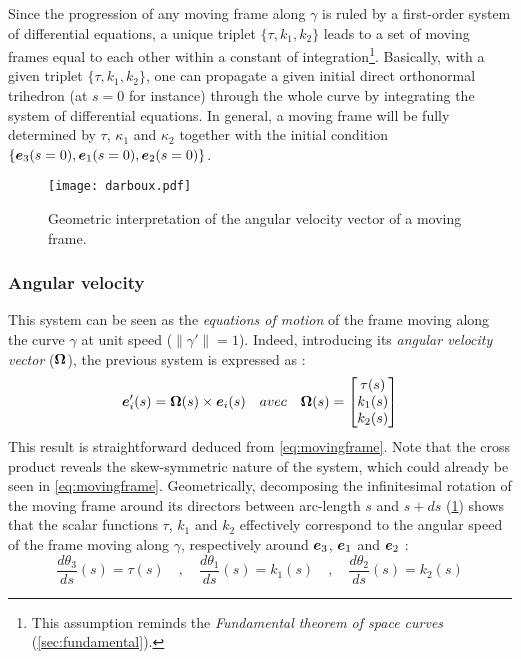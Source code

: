 Since the progression of any moving frame along $\gamma$ is ruled by a first-order system of differential equations, a unique triplet $\{\tau, k_{1}, k_{2}\}$ leads to a set of moving frames equal to each other within a constant of integration\footnote{
This assumption reminds the \emph{Fundamental theorem of space curves} (\cref{sec:fundamental}).
}. Basically, with a given triplet $\{\tau, k_{1}, k_{2}\}$, one can propagate a given initial direct orthonormal trihedron (at $s=0$ for instance) through the whole curve by integrating the system of differential equations. In general, a moving frame will be fully determined by $\tau$, $\kappa_{1}$ and $\kappa_{2}$ together with the initial condition $\{\boldsymbol{e}_{3}(s=0),\boldsymbol{e}_{1}(s=0),\boldsymbol{e}_{2}(s=0)\}$.

\begin{figure}[t]
\centering
\texttt{[image: darboux.pdf]}
\caption{Geometric interpretation of the angular velocity vector of a moving frame.}
\label{fig:3_4}
\end{figure}

\subsubsection{Angular velocity}
This system can be seen as the \emph{equations of motion} of the frame moving along the curve $\gamma$ at unit speed ($\|\gamma'\|=1$). Indeed, introducing its \emph{angular velocity vector} ($\boldsymbol{\Omega}$), the previous system is expressed as :
\begin{equation}
	\boldsymbol{e}'_{i}(s) = \boldsymbol{\Omega}(s) \times \boldsymbol{e}_{i}(s)
	\quad avec \quad
	\boldsymbol{\Omega}(s)
	=
	\begin{bmatrix}
		\tau(s) \\
		k_1(s) \\
		k_2(s)
	\end{bmatrix}
\end{equation}
This result is straightforward deduced from \cref{eq:movingframe}. Note that the cross product reveals the skew-symmetric nature of the system, which could already be seen in \cref{eq:movingframe}.
Geometrically, decomposing the infinitesimal rotation of the moving frame around its directors between arc-length $s$ and $s+ds$ (\cref{fig:3_4}) shows that the scalar functions $\tau$, $k_{1}$ and $k_{2}$ effectively correspond to the angular speed of the frame moving along $\gamma$, respectively around $\boldsymbol{e}_{3}$, $\boldsymbol{e}_{1}$ and $\boldsymbol{e}_{2}$ :
\begin{equation}
	\frac{d\theta_3}{ds}(s) = \tau(s)
	\quad,\quad
	\frac{d\theta_1}{ds}(s) = k_{1}(s)
	\quad,\quad
	\frac{d\theta_2}{ds}(s) = k_{2}(s)
\end{equation}

